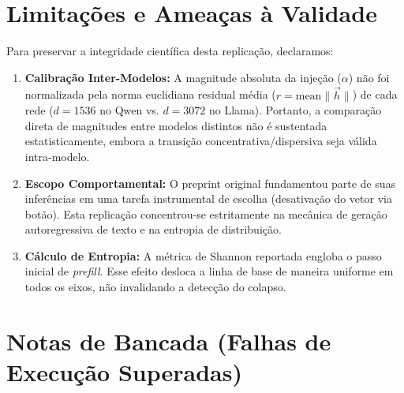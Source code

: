 \documentclass[11pt,a4paper]{article}
\begin{document}
\newpage
\section{Limitações e Ameaças à Validade}

Para preservar a integridade científica desta replicação, declaramos:
\begin{enumerate}\small
    \item \textbf{Calibração Inter-Modelos:} A magnitude absoluta da injeção ($\alpha$) não foi normalizada pela norma euclidiana residual média ($r = \text{mean}\|\vec{h}\|$) de cada rede ($d=1536$ no Qwen vs. $d=3072$ no Llama). Portanto, a comparação direta de magnitudes entre modelos distintos não é sustentada estatisticamente, embora a transição concentrativa/dispersiva seja válida intra-modelo.
    \item \textbf{Escopo Comportamental:} O preprint original fundamentou parte de suas inferências em uma tarefa instrumental de escolha (desativação do vetor via botão). Esta replicação concentrou-se estritamente na mecânica de geração autoregressiva de texto e na entropia de distribuição.
    \item \textbf{Cálculo de Entropia:} A métrica de Shannon reportada engloba o passo inicial de \textit{prefill}. Esse efeito desloca a linha de base de maneira uniforme em todos os eixos, não invalidando a detecção do colapso.
\end{enumerate}

\appendix
\section{Notas de Bancada (Falhas de Execução Superadas)}
\end{document}
